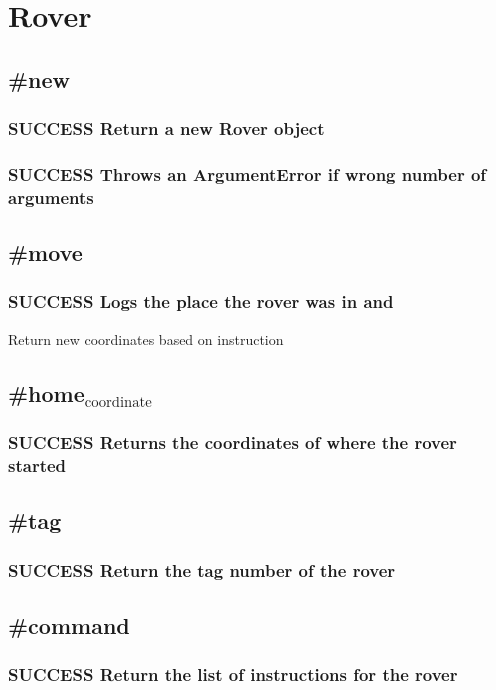 \documentclass{article}
\begin{document}
\section{Rover}
\label{sec-10}
\subsection{\#new}
\label{sec-10-1}
\subsubsection{\textbf{SUCCESS} Return a new Rover object}
\label{sec-10-1-1}
\subsubsection{\textbf{SUCCESS} Throws an ArgumentError if wrong number of arguments}
\label{sec-10-1-2}
\subsection{\#move}
\label{sec-10-2}
\subsubsection{\textbf{SUCCESS} Logs the place the rover was in and}
\label{sec-10-2-1}

        Return new coordinates based on instruction
\subsection{\#home$_{\mathrm{coordinate}}$}
\label{sec-10-3}
\subsubsection{\textbf{SUCCESS} Returns the coordinates of where the rover started}
\label{sec-10-3-1}
\subsection{\#tag}
\label{sec-10-4}
\subsubsection{\textbf{SUCCESS} Return the tag number of the rover}
\label{sec-10-4-1}
\subsection{\#command}
\label{sec-10-5}
\subsubsection{\textbf{SUCCESS} Return the list of instructions for the rover}
\label{sec-10-5-1}
\end{document}
